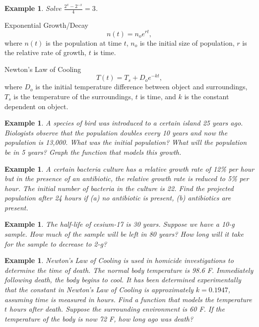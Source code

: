 \documentclass[twoside]{tufte-handout}
\newcounter{ekcounter}%
\theoremstyle{ekimcustom}
\newtheorem{exm}[ekcounter]{Example}
\begin{document}
\begin{exm}{Solve $ \frac{2^x-2^{-x}}{4}=3$.}
\end{exm}\vskip10pt



\begin{bformula}{Exponential Growth/Decay}{}
$$n(t)=n_oe^{rt},$$ where $n(t)$ is the population at time $t$, $n_o$ is the initial size of population, $r$ is the relative rate of growth, $t$ is time.
\end{bformula}

\begin{bformula}{Newton's Law of Cooling}{}
$$T(t)=T_s+D_oe^{-kt},$$ where $D_o$ is the initial temperature difference between object and surroundings, $T_s$ is the temperature of the surroundings, $t$ is time, and $k$ is the constant dependent on object. 
\end{bformula}


\everymath{\displaystyle}
\begin{exm}{A species of bird was introduced to a certain island 25 years ago. Biologists observe that the population doubles every 10 years and now the population is 13,000. What was the initial population? What will the population be in 5 years? Graph the function that models this growth.}
\end{exm}\vskip10pt






\everymath{\displaystyle}
\begin{exm}{}{A certain bacteria culture has a relative growth rate of 12\% per hour but in the presence of an antibiotic, the relative growth rate is reduced to 5\% per hour. The initial number of bacteria in the culture is 22. Find the projected population after 24 hours if (a) no antibiotic is present, (b) antibiotics are present.}
\end{exm}\vskip10pt

\begin{exm}{}{The half-life of cesium-17 is 30 years. Suppose we have a 10-g sample. How much of the sample will be left in 80 years? How long will it take for the sample to decrease to 2-g?}
\end{exm}\vskip10pt




\everymath{\displaystyle}
\begin{exm}{}{Newton's Law of Cooling is used in homicide investigations to determine the time of death. The normal body temperature is 98.6 F. Immediately following death, the body begins to cool. It has been determined experimentally that the constant in Newton's Law of Cooling is approximately $k=0.1947$, assuming time is measured in hours. Find a function that models the temperature $t$ hours after death. Suppose the surrounding environment is 60 F. If the temperature of the body is now 72 F, how long ago was death? }
\end{exm}\vskip10pt
\end{document}
